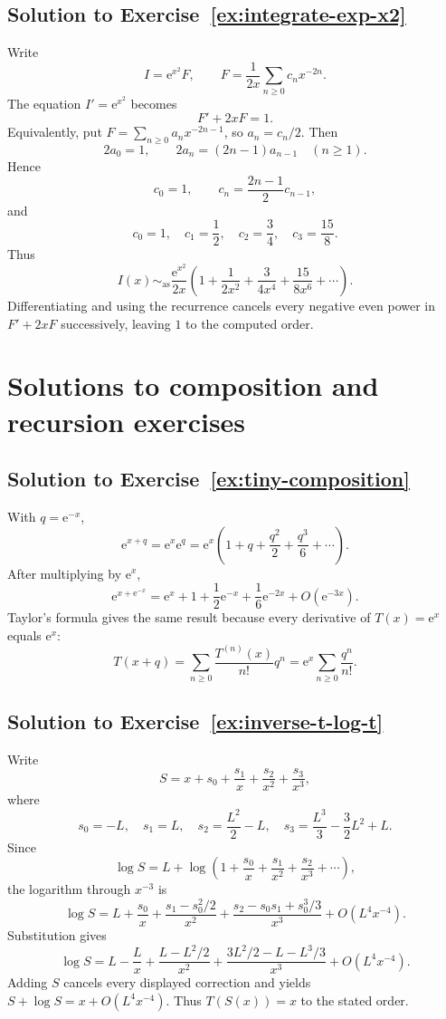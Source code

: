 \documentclass[11pt,oneside]{book}
\theoremstyle{definition}
\theoremstyle{remark}
\newcommand{\asympseries}{\sim_{\!\mathrm{as}}}
\newcommand{\e}{\mathrm{e}}
\newcommand{\bigO}{O}
\begin{document}
\subsection*{Solution to Exercise~\ref{ex:integrate-exp-x2}}

Write
\[
  I=\e^{x^2}F,
  \qquad
  F=\frac1{2x}\sum_{n\ge0}c_nx^{-2n}.
\]
The equation $I'=\e^{x^2}$ becomes
\[
  F'+2xF=1.
\]
Equivalently, put
$F=\sum_{n\ge0}a_nx^{-2n-1}$, so $a_n=c_n/2$. Then
\[
  2a_0=1,
  \qquad 2a_n=(2n-1)a_{n-1}\quad(n\ge1).
\]
Hence
\[
  c_0=1,
  \qquad c_n=\frac{2n-1}{2}c_{n-1},
\]
and
\[
  c_0=1,
  \quad c_1=\frac12,
  \quad c_2=\frac34,
  \quad c_3=\frac{15}{8}.
\]
Thus
\[
  I(x)\asympseries
  \frac{\e^{x^2}}{2x}
  \left(1+\frac1{2x^2}+\frac3{4x^4}
    +\frac{15}{8x^6}+\cdots\right).
\]
Differentiating and using the recurrence cancels every negative even power in
$F'+2xF$ successively, leaving $1$ to the computed order.

\section{Solutions to composition and recursion exercises}

\subsection*{Solution to Exercise~\ref{ex:tiny-composition}}

With $q=\e^{-x}$,
\[
  \e^{x+q}=\e^x\e^q
  =\e^x\left(1+q+\frac{q^2}{2}+\frac{q^3}{6}+\cdots\right).
\]
After multiplying by $\e^x$,
\[
  \boxed{
  \e^{x+\e^{-x}}
  =\e^x+1+\frac12\e^{-x}+\frac16\e^{-2x}
   +\bigO(\e^{-3x})}.
\]
Taylor's formula gives the same result because every derivative of
$T(x)=\e^x$ equals $\e^x$:
\[
  T(x+q)=\sum_{n\ge0}\frac{T^{(n)}(x)}{n!}q^n
  =\e^x\sum_{n\ge0}\frac{q^n}{n!}.
\]

\subsection*{Solution to Exercise~\ref{ex:inverse-t-log-t}}

Write
\[
  S=x+s_0+\frac{s_1}{x}+\frac{s_2}{x^2}+\frac{s_3}{x^3},
\]
where
\[
  s_0=-L,
  \quad s_1=L,
  \quad s_2=\frac{L^2}{2}-L,
  \quad s_3=\frac{L^3}{3}-\frac32L^2+L.
\]
Since
\[
  \log S=L+
  \log\left(1+\frac{s_0}{x}+\frac{s_1}{x^2}
                    +\frac{s_2}{x^3}+\cdots\right),
\]
the logarithm through $x^{-3}$ is
\[
  \log S
  =L+\frac{s_0}{x}
   +\frac{s_1-s_0^2/2}{x^2}
   +\frac{s_2-s_0s_1+s_0^3/3}{x^3}
   +\bigO(L^4x^{-4}).
\]
Substitution gives
\[
  \log S
  =L-\frac{L}{x}
   +\frac{L-L^2/2}{x^2}
   +\frac{3L^2/2-L-L^3/3}{x^3}
   +\bigO(L^4x^{-4}).
\]
Adding $S$ cancels every displayed correction and yields
$S+\log S=x+\bigO(L^4x^{-4})$. Thus $T(S(x))=x$ to the stated order.
\end{document}
